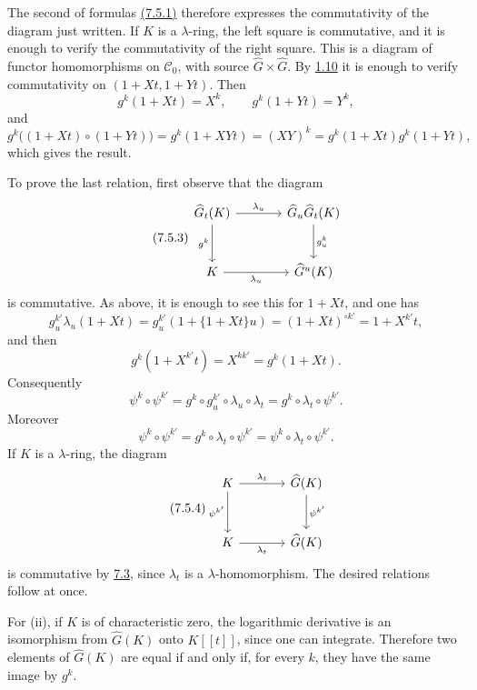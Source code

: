 The second of formulas \hyperlink{sga6.e05.eq.7-5-1}{(7.5.1)} therefore expresses the commutativity of the diagram just written. If \(K\) is a \(\lambda\)-ring, the left square is commutative, and it is enough to verify the commutativity of the right square. This is a diagram of functor homomorphisms on \(\mathscr C_0\), with source \(\widehat G\times\widehat G\). By \hyperlink{sga6.e05.thm.1-10}{1.10} it is enough to verify commutativity on \((1+Xt,1+Yt)\). Then
\[
  g^k(1+Xt)=X^k,\qquad
  g^k(1+Yt)=Y^k,
\]
and
\[
  g^k\bigl((1+Xt)\circ(1+Yt)\bigr)
  =
  g^k(1+XYt)
  =
  (XY)^k
  =
  g^k(1+Xt)g^k(1+Yt),
\]
which gives the result.

To prove the last relation, first observe that the diagram
\begin{equation}\tag{7.5.3}
\begin{tikzcd}[column sep=large,row sep=large]
\widehat G_t(K) \arrow[r,"\lambda_u"] \arrow[d,"g^k"'] &
\widehat G_u\widehat G_t(K) \arrow[d,"g^k_u"]\\
K \arrow[r,"\lambda_u"'] &
\widehat G^u(K)
\end{tikzcd}
\end{equation}
is commutative. As above, it is enough to see this for \(1+Xt\), and one has
\[
  g^{k'}_u\lambda_u(1+Xt)
  =
  g^{k'}_u(1+\{1+Xt\}u)
  =
  (1+Xt)^{\circ k'}
  =
  1+X^{k'}t,
\]
and then
\[
  g^k(1+X^{k'}t)=X^{kk'}=g^k(1+Xt).
\]
Consequently
\[
  \psi^k\circ\psi^{k'}
  =
  g^k\circ g^{k'}_u\circ\lambda_u\circ\lambda_t
  =
  g^k\circ\lambda_t\circ\psi^{k'}.
\]
Moreover
\[
  \psi^k\circ\psi^{k'}
  =
  g^k\circ\lambda_t\circ\psi^{k'}
  =
  \psi^k\circ\lambda_t\circ\psi^{k'}.
\]
If \(K\) is a \(\lambda\)-ring, the diagram
\begin{equation}\tag{7.5.4}
\begin{tikzcd}[column sep=large,row sep=large]
K \arrow[r,"\lambda_t"] \arrow[d,"\psi^{k'}"'] &
\widehat G(K) \arrow[d,"\psi^{k'}"]\\
K \arrow[r,"\lambda_t"'] &
\widehat G(K)
\end{tikzcd}
\end{equation}
is commutative by \hyperlink{sga6.e05.para.7-3}{7.3}, since \(\lambda_t\) is a \(\lambda\)-homomorphism. The desired relations follow at once.

For (ii), if \(K\) is of characteristic zero, the logarithmic derivative is an isomorphism from \(\widehat G(K)\) onto \(K[[t]]\), since one can integrate. Therefore two elements of \(\widehat G(K)\) are equal if and only if, for every \(k\), they have the same image by \(g^k\).

